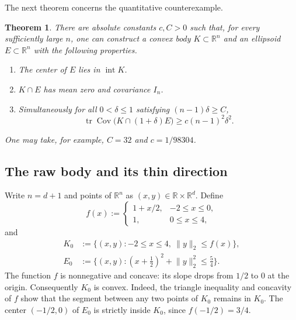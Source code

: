\documentclass[11pt]{article}
\numberwithin{equation}{section}
\newtheorem{theorem}{Theorem}
\theoremstyle{definition}
\begin{document}
The next theorem concerns the quantitative counterexample.

\begin{theorem}
\label{app:counterexample:theorem:quantitative}
There are absolute constants $c,C>0$ such that, for every sufficiently large
$n$, one can construct a convex body
$K\subset\mathbb{R}^n$ and an ellipsoid
$E\subset\mathbb{R}^n$ with the following properties.
\begin{enumerate}
\item \label{itm:quantitative:1} The center of $E$ lies in
  $\operatorname{int}K$.

\item \label{itm:quantitative:2} $K\cap E$ has mean zero and covariance
  $I_n$.

\item \label{itm:quantitative:3} Simultaneously for all $0<\delta\leq 1$
  satisfying
  $(n-1)\delta\geq C$,
\[
  \operatorname{tr}\operatorname{Cov}\bigl(K\cap(1+\delta)E\bigr)
  \geq c(n-1)^2\delta^2.
\]
\end{enumerate}
One may take, for example, $C=32$ and
$c=1/98304$.
\end{theorem}

\subsection{The raw body and its thin direction}
\label{app:counterexample:raw-body}

Write $n=d+1$ and points of
$\mathbb{R}^n$ as
$(x,y)\in\mathbb{R}\times\mathbb{R}^d$.
Define
\[
  f(x):=
  \begin{cases}
    1+x/2, & -2\leq x\leq 0,\\
    1,     & 0\leq x\leq 4,
  \end{cases}
\]
and
\begin{equation}
\label{app:counterexample:eq:raw-definitions}
\begin{aligned}
  K_0 &:= \{(x,y):-2\leq x\leq 4,\ \lVert y\rVert_2\leq f(x)\},\\
  E_0 &:= \{(x,y):(x+\tfrac12)^2+\lVert y\rVert_2^2\leq\tfrac54\}.
\end{aligned}
\end{equation}
The function $f$ is nonnegative and concave: its slope drops from
$1/2$ to
$0$ at the origin.
Consequently $K_0$ is convex.
Indeed, the triangle inequality and concavity of $f$ show that the segment
between any two points of
$K_0$ remains in
$K_0$.
The center $(-1/2,0)$ of
$E_0$ is strictly inside
$K_0$, since
$f(-1/2)=3/4$.
\end{document}
